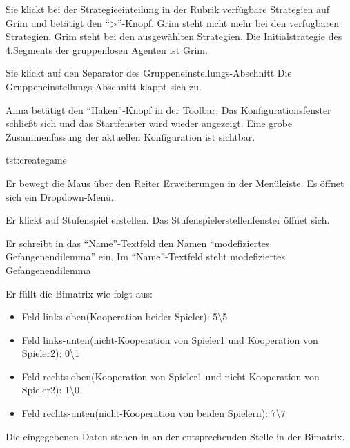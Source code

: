 \documentclass[parskip=full,11pt]{scrartcl}
\begin{document}
{Sie klickt bei der Strategieeinteilung in der Rubrik verfügbare Strategien auf Grim und betätigt den \enquote{>}-Knopf.}
{Grim steht nicht mehr bei den verfügbaren Strategien. Grim steht bei den ausgewählten Strategien. Die Initialstrategie des 4.Segments der gruppenlosen Agenten ist Grim.}

{Sie klickt auf den Separator des Gruppeneinstellungs-Abschnitt}
{Die Gruppeneinstellungs-Abschnitt klappt sich zu.}

{Anna betätigt den \enquote{Haken}-Knopf in der Toolbar.}
{Das Konfigurationsfenster schließt sich und das Startfenster wird wieder angezeigt. Eine grobe Zusammenfassung der aktuellen Konfiguration ist sichtbar.}

{tst:creategame}

{Er bewegt die Maus über den Reiter Erweiterungen in der Menüleiste.}
{Es öffnet sich ein Dropdown-Menü.}

{Er klickt auf Stufenspiel erstellen.}
{Das Stufenspielerstellenfenster öffnet sich.}

{Er schreibt in das \enquote{Name}-Textfeld den Namen \enquote{modefiziertes Gefangenendilemma} ein.}
{Im \enquote{Name}-Textfeld steht modefiziertes Gefangenendilemma}

{Er füllt die Bimatrix wie folgt aus:
\begin{itemize}
\item Feld links-oben(Kooperation beider Spieler): 5\textbackslash 5
\item Feld links-unten(nicht-Kooperation von Spieler1 und Kooperation von Spieler2): 0\textbackslash 1
\item Feld rechts-oben(Kooperation von Spieler1 und nicht-Kooperation von Spieler2): 1\textbackslash 0
\item Feld rechts-unten(nicht-Kooperation von beiden Spielern): 7\textbackslash 7
\end{itemize}}
{Die eingegebenen Daten stehen in an der entsprechenden Stelle in der Bimatrix.}
\end{document}
